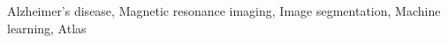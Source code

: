 \documentclass[conference]{IEEEtran}
\begin{document}
\begin{IEEEkeywords}
Alzheimer's disease, Magnetic resonance imaging, Image segmentation, Machine learning, Atlas
\end{IEEEkeywords}









%
\end{document}
